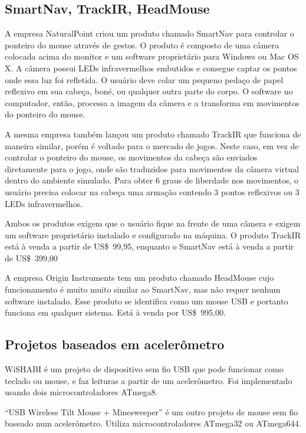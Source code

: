 \documentclass[brazil,pagestart=firstchapter]{abnt}
\begin{document}
\subsection{SmartNav, TrackIR, HeadMouse}
\label{sub:naturalpoint}

A empresa NaturalPoint criou um produto chamado SmartNav \cite{SmartNav}
para controlar o ponteiro do mouse através de gestos. O produto é composto
de uma câmera colocada acima do monitor e um software proprietário para
Windows ou Mac OS X. A câmera possui \acsp{LED} infravermelhos embutidos e
consegue captar os pontos onde essa luz foi refletida. O usuário deve colar
um pequeno pedaço de papel reflexivo em sua cabeça, boné, ou qualquer outra
parte do corpo. O software no computador, então, processa a imagem da câmera
e a transforma em movimentos do ponteiro do mouse.

A mesma empresa também lançou um produto chamado TrackIR \cite{TrackIR} que
funciona de maneira similar, porém é voltado para o mercado de jogos. Neste
caso, em vez de controlar o ponteiro do mouse, os movimentos da cabeça são
enviados diretamente para o jogo, onde são traduzidos para movimentos da
câmera virtual dentro do ambiente simulado. Para obter 6 graus de liberdade
nos movimentos, o usuário precisa colocar na cabeça uma armação contendo 3
pontos reflexivos ou 3 \acsp{LED} infravermelhos.

Ambos os produtos exigem que o usuário fique na frente de uma câmera e
exigem um software proprietário instalado e configurado na máquina. O
produto TrackIR está à venda a partir de US\$~99,95, enquanto o SmartNav
está à venda a partir de US\$~399,00

A empresa Origin Instruments tem um produto chamado HeadMouse
\cite{HeadMouse} cujo funcionamento é muito muito similar ao SmartNav, mas
não requer nenhum software instalado. Esse produto se identifica como um
mouse \acs{USB} e portanto funciona em qualquer sistema. Está à venda por
US\$~995,00.


\subsection{Projetos baseados em acelerômetro}
\label{sub:acelerometro}

WiSHABI \cite{WiSHABI} é um projeto de dispositivo sem fio \acs{USB} que
pode funcionar como teclado ou mouse, e faz leituras a partir de um
acelerômetro. Foi implementado usando dois microcontroladores ATmega8.

``USB Wireless Tilt Mouse + Minesweeper'' \cite{USBWirelessTiltMouse} é um
outro projeto de mouse sem fio baseado num acelerômetro. Utiliza
microcontroladores ATmega32 ou ATmega644.
\end{document}
